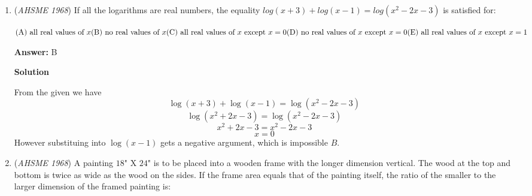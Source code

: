 \begin{enumerate}
 $\text{(A) equal to } \frac{1}{4}\quad\\ \text{(B) equal to or greater than } \frac{1}{8} \text{ and less than }\frac{1}{2}\quad\\ \text{(C) greater than } \frac{1}{8} \text{ and less than }\frac{1}{2}\quad\\ \text{(D) equal to or greater than } \frac{1}{8} \text{ and less than }\frac{1}{4}\quad\\ \text{(E) less than }\frac{1}{2}$

 \textbf{Answer: }E



\textbf{Solution}

As a consequence of the \href{https://artofproblemsolving.com/wiki/index.php?title=Triangle\_Inequality}{Triangle Inequality}, we can form a quadrilateral from the four segments iff the sum of any three sides is greater than the sum of the fourth side. Thus, no segment can have a length $\geq \frac{1}{2}$. All other segment lengths are valid, so long as the inequality is satsified. Thus, our answer is $\fbox{(E) less than 1/2}$.

 


	\item (\textit{AHSME 1968}) If all the logarithms are real numbers, the equality
$log(x+3)+log(x-1)=log(x^2-2x-3)$
is satisfied for:


 $\text{(A) all real values of }x \quad\\ \text{(B) no real values of } x\quad\\ \text{(C) all real values of } x \text{ except } x=0\quad\\ \text{(D) no real values of } x \text{ except } x=0\quad\\ \text{(E) all real values of } x \text{ except } x=1$

 \textbf{Answer: }B



\textbf{Solution}

From the given we have
 \[\log(x+3)+\log(x-1)=\log(x^2-2x-3)\]
 \[\log(x^2+2x-3)=\log(x^2-2x-3)\]
 \[x^2+2x-3=x^2-2x-3\]
 \[x=0\]However substituing into $\log(x-1)$ gets a negative argument, which is impossible $\boxed{B}$.

 


	\item (\textit{AHSME 1968}) A painting $18$" X $24$" is to be placed into a wooden frame with the longer dimension vertical. The wood at the top and bottom is twice as wide as the wood on the sides. If the frame area equals that of the painting itself, the ratio of the smaller to the larger dimension of the framed painting is:



\end{enumerate}
